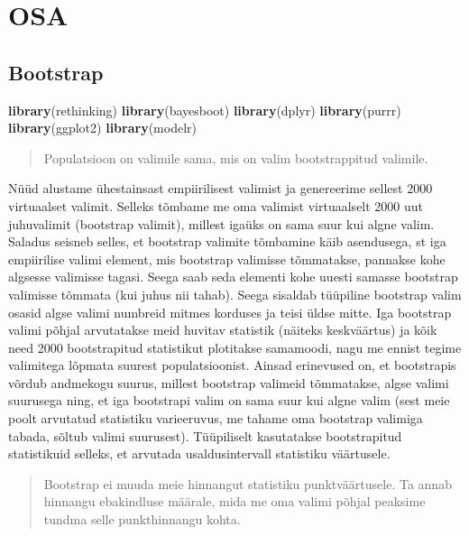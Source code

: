 \documentclass[]{book}
\newenvironment{Shaded}{\begin{snugshade}}{\end{snugshade}}
\newcommand{\KeywordTok}[1]{\textcolor[rgb]{0.13,0.29,0.53}{\textbf{#1}}}
\newcommand{\NormalTok}[1]{#1}
\begin{document}
\hypertarget{part-osa-1}{%
\part{OSA}\label{part-osa-1}}

\hypertarget{bootstrap}{%
\chapter{Bootstrap}\label{bootstrap}}

\begin{Shaded}
\begin{Highlighting}[]
\KeywordTok{library}\NormalTok{(rethinking)}
\KeywordTok{library}\NormalTok{(bayesboot)}
\KeywordTok{library}\NormalTok{(dplyr)}
\KeywordTok{library}\NormalTok{(purrr)}
\KeywordTok{library}\NormalTok{(ggplot2)}
\KeywordTok{library}\NormalTok{(modelr)}
\end{Highlighting}
\end{Shaded}

\begin{quote}
Populatsioon on valimile sama, mis on valim bootstrappitud valimile.
\end{quote}

Nüüd alustame ühestainsast empiirilisest valimist ja genereerime sellest 2000 virtuaalset valimit.
Selleks tõmbame me oma valimist virtuaalselt 2000 uut juhuvalimit (bootstrap valimit), millest igaüks on sama suur kui algne valim.
Saladus seisneb selles, et bootstrap valimite tõmbamine käib asendusega, st iga empiirilise valimi element, mis bootstrap valimisse tõmmatakse, pannakse kohe algsesse valimisse tagasi.
Seega saab seda elementi kohe uuesti samasse bootstrap valimisse tõmmata (kui juhus nii tahab).
Seega sisaldab tüüpiline bootstrap valim osasid algse valimi numbreid mitmes korduses ja teisi üldse mitte.
Iga bootstrap valimi põhjal arvutatakse meid huvitav statistik (näiteks keskväärtus) ja kõik need 2000 bootstrapitud statistikut plotitakse samamoodi, nagu me ennist tegime valimitega lõpmata suurest populatsioonist.
Ainsad erinevused on, et bootstrapis võrdub andmekogu suurus, millest bootstrap valimeid tõmmatakse, algse valimi suurusega ning, et iga bootstrapi valim on sama suur kui algne valim (sest meie poolt arvutatud statistiku varieeruvus, me tahame oma bootstrap valimiga tabada, sõltub valimi suurusest).
Tüüpiliselt kasutatakse bootstrapitud statistikuid selleks, et arvutada usaldusintervall statistiku väärtusele.

\begin{quote}
Bootstrap ei muuda meie hinnangut statistiku punktväärtusele. Ta annab hinnangu
ebakindluse määrale, mida me oma valimi põhjal peaksime tundma selle punkthinnangu kohta.
\end{quote}
\end{document}
